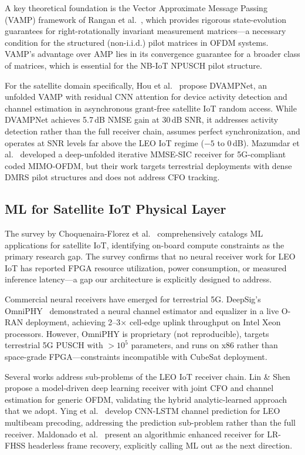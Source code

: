 \documentclass{article}
\begin{document}
A key theoretical foundation is the Vector Approximate Message Passing (VAMP) framework of Rangan et al.~\cite{rangan2017vamp,rangan2019vamp}, which provides rigorous state-evolution guarantees for right-rotationally invariant measurement matrices---a necessary condition for the structured (non-i.i.d.) pilot matrices in OFDM systems. VAMP's advantage over AMP lies in its convergence guarantee for a broader class of matrices, which is essential for the NB-IoT NPUSCH pilot structure.

For the satellite domain specifically, Hou et al.~\cite{hou2025dvampnet} propose DVAMPNet, an unfolded VAMP with residual CNN attention for device activity detection and channel estimation in asynchronous grant-free satellite IoT random access. While DVAMPNet achieves 5.7\,dB NMSE gain at 30\,dB SNR, it addresses activity detection rather than the full receiver chain, assumes perfect synchronization, and operates at SNR levels far above the LEO IoT regime ($-5$ to 0\,dB). Mazumdar et al.~\cite{mazumdar2024dui} developed a deep-unfolded iterative MMSE-SIC receiver for 5G-compliant coded MIMO-OFDM, but their work targets terrestrial deployments with dense DMRS pilot structures and does not address CFO tracking.

\subsection{ML for Satellite IoT Physical Layer}

The survey by Choquenaira-Florez et al.~\cite{choquenaira2025ml} comprehensively catalogs ML applications for satellite IoT, identifying on-board compute constraints as the primary research gap. The survey confirms that no neural receiver work for LEO IoT has reported FPGA resource utilization, power consumption, or measured inference latency---a gap our architecture is explicitly designed to address.

Commercial neural receivers have emerged for terrestrial 5G. DeepSig's OmniPHY~\cite{deepsig2024} demonstrated a neural channel estimator and equalizer in a live O-RAN deployment, achieving 2--3$\times$ cell-edge uplink throughput on Intel Xeon processors. However, OmniPHY is proprietary (not reproducible), targets terrestrial 5G PUSCH with $>10^5$ parameters, and runs on x86 rather than space-grade FPGA---constraints incompatible with CubeSat deployment.

Several works address sub-problems of the LEO IoT receiver chain. Lin \& Shen~\cite{lin2024hybrid} propose a model-driven deep learning receiver with joint CFO and channel estimation for generic OFDM, validating the hybrid analytic-learned approach that we adopt. Ying et al.~\cite{ying2024cnn} develop CNN-LSTM channel prediction for LEO multibeam precoding, addressing the prediction sub-problem rather than the full receiver. Maldonado et al.~\cite{maldonado2025lrfhss} present an algorithmic enhanced receiver for LR-FHSS headerless frame recovery, explicitly calling ML out as the next direction.
\end{document}
